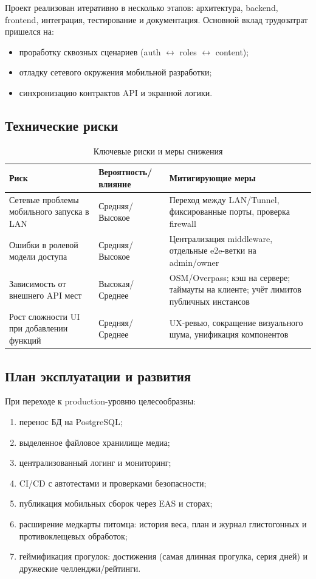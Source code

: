 \documentclass[12pt,a4paper]{article}
\begin{document}
Проект реализован итеративно в несколько этапов: архитектура, backend, frontend, интеграция, тестирование и документация. Основной вклад трудозатрат пришелся на:
\begin{itemize}
  \item проработку сквозных сценариев (auth $\leftrightarrow$ roles $\leftrightarrow$ content);
  \item отладку сетевого окружения мобильной разработки;
  \item синхронизацию контрактов API и экранной логики.
\end{itemize}

\subsection{Технические риски}

\begin{table}[H]
\centering
\small
\caption{Ключевые риски и меры снижения}
\begin{tabular}{|L{0.36\textwidth}|L{0.26\textwidth}|L{0.28\textwidth}|}
\hline
\textbf{Риск} & \textbf{Вероятность/влияние} & \textbf{Митигирующие меры} \\
\hline
Сетевые проблемы мобильного запуска в LAN & Средняя/Высокое & Переход между LAN/Tunnel, фиксированные порты, проверка firewall \\
\hline
Ошибки в ролевой модели доступа & Средняя/Высокое & Централизация middleware, отдельные e2e-ветки на admin/owner \\
\hline
Зависимость от внешнего API мест & Высокая/Среднее & OSM/Overpass; кэш на сервере; таймауты на клиенте; учёт лимитов публичных инстансов \\
\hline
Рост сложности UI при добавлении функций & Средняя/Среднее & UX-ревью, сокращение визуального шума, унификация компонентов \\
\hline
\end{tabular}
\end{table}

\subsection{План эксплуатации и развития}

При переходе к production-уровню целесообразны:
\begin{enumerate}
  \item перенос БД на PostgreSQL;
  \item выделенное файловое хранилище медиа;
  \item централизованный логинг и мониторинг;
  \item CI/CD с автотестами и проверками безопасности;
  \item публикация мобильных сборок через EAS и сторах;
  \item расширение медкарты питомца: история веса, план и журнал глистогонных и противоклещевых обработок;
  \item геймификация прогулок: достижения (самая длинная прогулка, серия дней) и дружеские челленджи/рейтинги.
\end{enumerate}
\end{document}
